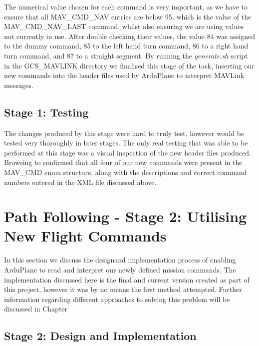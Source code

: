 The numerical value chosen for each command is very important, as we have to ensure that all MAV\_CMD\_NAV entries are below 95, which is the value of the MAV\_CMD\_NAV\_LAST command, whilst also ensuring we are using values not currently in use. After double checking their values, the value 84 was assigned to the dummy command, 85 to the left hand turn command, 86 to a right hand turn command, and 87 to a straight segment. By running the \textit{generate.sh} script in the GCS\_MAVLINK directory we finalised this stage of the task, inserting our new commands into the header files used by ArduPlane to interpret MAVLink messages.

\subsection{Stage 1: Testing}
\label{task2:stage1:testing}

The changes produced by this stage were hard to truly test, however would be tested very thoroughly in later stages. The only real testing that was able to be performed at this stage was a visual inspection of the new header files produced. Browsing to  confirmed that all four of our new commands were present in the MAV\_CMD enum structure, along with the descriptions and correct command numbers entered in the XML file discussed above. 

\section{Path Following - Stage 2: Utilising New Flight Commands}
\label{task2:stage1}

In this section we discuss the designand implementation process of enabling ArduPlane to read and interpret our newly defined mission commands. The implementation discussed here is the final and current version created as part of this project, however it was by no means the first method attempted. Further information regarding different approaches to solving this problem will be discussed in Chapter %

\subsection{Stage 2: Design and Implementation}
\label{task2:stage2:design}

